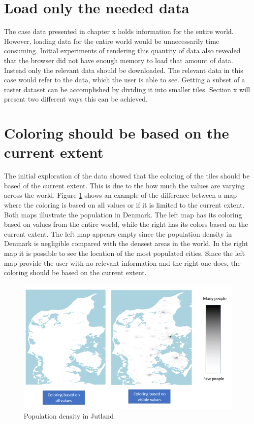 \section{Load only the needed data}
The case data presented in chapter x holds information for the entire world. However, loading data for the entire world would be unnecessarily time consuming. Initial experiments of rendering this quantity of data also revealed that the browser did not have enough memory to load that amount of data. Instead only the relevant data should be downloaded. The relevant data in this case would refer to the data, which the user is able to see. Getting a subset of a raster dataset can be accomplished by dividing it into smaller tiles. Section x will present two different ways this can be achieved. 

\section{Coloring should be based on the current extent}
The initial exploration of the data showed that the coloring of the tiles should be based of the current extent. This is due to the how much the values are varying across the world. Figure \ref{WhyLimitToExtent} shows an example of the difference between a map where the coloring is based on all values or if it is limited to the current extent. Both maps illustrate the population in Denmark. The left map has its coloring based on values from the entire world, while the right has its colors based on the current extent. The left map appears empty since the population density in Denmark is negligible compared with the densest areas in the world. In the right map it is possible to see the location of the most populated cities. Since the left map provide the user with no relevant information and the right one does, the coloring should be based on the current extent.
 
 
\begin{figure} [H]
	\centering
	\includegraphics[width=.8\textwidth]{Pictures/WhyLimitToExtent}
	\caption{Population density in Jutland}
	\label{WhyLimitToExtent}
\end{figure}




